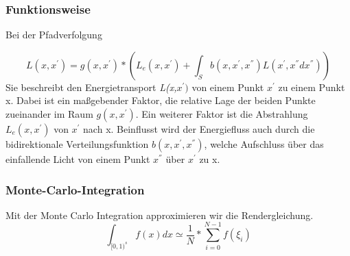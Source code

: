 \subsubsection{Funktionsweise}
Bei der Pfadverfolgung

    \begin{equation}
        L(x,{x}^{'}) = g(x,{x}^{'}) * (L_{e}(x,{x}^{'}) + 
                        \int_{S}^{} b(x,{x}^{'},{x}^{''})
                        L({x}^{'},{x}^{''}d{x}^{''})) 
    \end{equation}
    Sie beschreibt den Energietransport \textit{L(x,${x}^{'})$} von einem Punkt ${x}^{'}$
    zu einem Punkt x. Dabei ist ein maßgebender Faktor, die relative Lage der beiden Punkte
    zueinander im Raum $g(x,{x}^{'})$. Ein weiterer Faktor ist die Abstrahlung 
    $L_{e}(x,{x}^{'})$ von ${x}^{'}$ nach x. Beinflusst wird der Energiefluss auch durch
    die bidirektionale Verteilungsfunktion $b(x,{x}^{'},{x}^{''})$, welche Aufschluss über
    das einfallende Licht von einem Punkt ${x}^{''}$ über ${x}^{'}$ zu x.

\subsubsection{Monte-Carlo-Integration}
    Mit der Monte Carlo Integration approximieren wir die Rendergleichung.
    \cite{KK02}
    \label{pic:MonteCarloIntegration}
    \begin{equation}
    \int_{{[0,1)}^s} f(x) dx \simeq \frac{1}{N}*\sum_{i=0}^{N-1}f(\xi_i)
    \end{equation}


